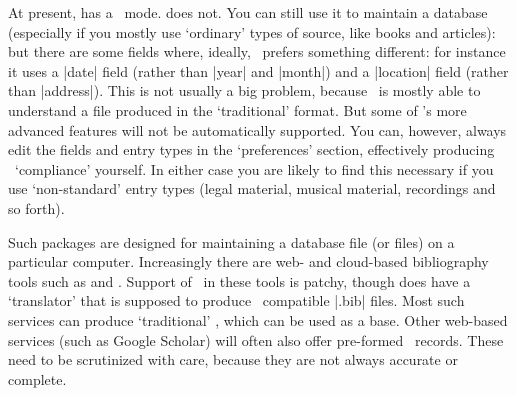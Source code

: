 At present,  has a \biblatex\ mode. 
does not. You can still use it to maintain a database (especially if
you mostly use `ordinary' types of source, like books and articles):
but there are some fields where, ideally, \biblatex\ prefers something
different: for instance it uses a |date| field (rather than |year| and
|month|) and a |location| field (rather than |address|). This is not
usually a big problem, because \biblatex\ is mostly able to understand
a file produced in the `traditional' format. But some of \biblatex's
more advanced features will not be automatically supported. You can,
however, always edit the fields and entry types in the `preferences'
section, effectively producing \biblatex\ `compliance' yourself. In
either case you are likely to find this necessary if you use
`non-standard' entry types (legal material, musical material,
recordings and so forth).

Such packages are designed for maintaining a database file (or files)
on a particular computer. Increasingly there are web- and cloud-based
bibliography tools such as  and
. Support of \biblatex\ in these tools is patchy,
though  does have a `translator' that is supposed to
produce \biblatex\ compatible |.bib| files. Most such services can
produce `traditional' \bibtex, which can be used as a base. Other
web-based services (such as Google Scholar) will often also offer
pre-formed \bibtex\ records. These need to be scrutinized with care,
because they are not always accurate or complete.

